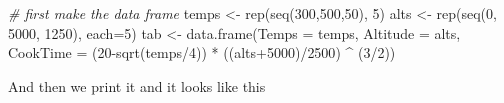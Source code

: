 \documentclass[
]{article}
\newenvironment{Shaded}{\begin{snugshade}}{\end{snugshade}}
\newcommand{\AttributeTok}[1]{\textcolor[rgb]{0.77,0.63,0.00}{#1}}
\newcommand{\CommentTok}[1]{\textcolor[rgb]{0.56,0.35,0.01}{\textit{#1}}}
\newcommand{\DecValTok}[1]{\textcolor[rgb]{0.00,0.00,0.81}{#1}}
\newcommand{\FunctionTok}[1]{\textcolor[rgb]{0.00,0.00,0.00}{#1}}
\newcommand{\NormalTok}[1]{#1}
\newcommand{\OtherTok}[1]{\textcolor[rgb]{0.56,0.35,0.01}{#1}}
\newcommand{\SpecialCharTok}[1]{\textcolor[rgb]{0.00,0.00,0.00}{#1}}
\begin{document}
\begin{Shaded}
\begin{Highlighting}[]
\CommentTok{\# first make the data frame}
\NormalTok{temps }\OtherTok{\textless{}{-}} \FunctionTok{rep}\NormalTok{(}\FunctionTok{seq}\NormalTok{(}\DecValTok{300}\NormalTok{,}\DecValTok{500}\NormalTok{,}\DecValTok{50}\NormalTok{), }\DecValTok{5}\NormalTok{)}
\NormalTok{alts }\OtherTok{\textless{}{-}} \FunctionTok{rep}\NormalTok{(}\FunctionTok{seq}\NormalTok{(}\DecValTok{0}\NormalTok{, }\DecValTok{5000}\NormalTok{, }\DecValTok{1250}\NormalTok{), }\AttributeTok{each=}\DecValTok{5}\NormalTok{)}
\NormalTok{tab }\OtherTok{\textless{}{-}} \FunctionTok{data.frame}\NormalTok{(}\AttributeTok{Temps =}\NormalTok{ temps, }\AttributeTok{Altitude =}\NormalTok{ alts, }
                  \AttributeTok{CookTime =}\NormalTok{ (}\DecValTok{20}\SpecialCharTok{{-}}\FunctionTok{sqrt}\NormalTok{(temps}\SpecialCharTok{/}\DecValTok{4}\NormalTok{)) }\SpecialCharTok{*}\NormalTok{ ((alts}\SpecialCharTok{+}\DecValTok{5000}\NormalTok{)}\SpecialCharTok{/}\DecValTok{2500}\NormalTok{) }\SpecialCharTok{\^{}}\NormalTok{ (}\DecValTok{3}\SpecialCharTok{/}\DecValTok{2}\NormalTok{))}
\end{Highlighting}
\end{Shaded}

And then we print it and it looks like this
\end{document}
